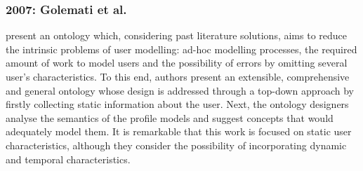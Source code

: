 
\subsubsection{2007: Golemati et al.}
\label{sec:golemati2007creating}

\citet{golemati_creating_2007} present an ontology which, considering past 
literature solutions, aims to reduce the intrinsic problems of user modelling: 
ad-hoc modelling processes, the required amount of work to model users and the 
possibility of errors by omitting several user's characteristics. To this end,
authors present an extensible, comprehensive and general ontology whose design
is addressed through a top-down approach by firstly collecting static information
about the user. Next, the ontology designers analyse the semantics of the profile
models and suggest concepts that would adequately model them. It is remarkable
that this work is focused on static user characteristics, although they consider 
the possibility of incorporating dynamic and temporal characteristics.




